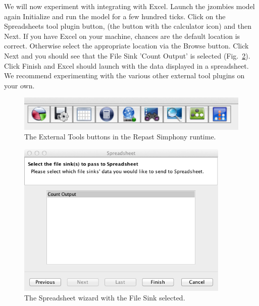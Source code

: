 \documentclass[11pt]{amsart}
\begin{document}
We will now experiment with integrating with Excel. Launch the jzombies model again Initialize and run the model for a few hundred ticks.  Click on the Spreadsheets tool plugin button, (the button with the calculator icon) and then Next. If you have Excel on your machine, chances are the default location is correct. Otherwise select the appropriate location via the Browse button. Click Next and you should see that the File Sink 'Count Output' is selected (Fig.~\ref{fig:spreadsheet}). Click Finish and Excel should launch with the data displayed in a spreadsheet. We recommend experimenting with the various other external tool plugins on your own.

\begin{figure}
\begin{center}
\vspace{.2in}
\centerline {
\includegraphics[width=5in]{GettingStartedImages/ExternalTools.png}
}
\caption{The External Tools buttons in the Repast Simphony runtime.}
\label{fig:externaltools}
\end{center}
\end{figure}

\begin{figure}
\begin{center}
\vspace{.2in}
\centerline {
\includegraphics[width=4in]{GettingStartedImages/Spreadsheet.png}
}
\caption{The Spreadsheet wizard with the File Sink selected.}
\label{fig:spreadsheet}
\end{center}
\end{figure}
\end{document}
